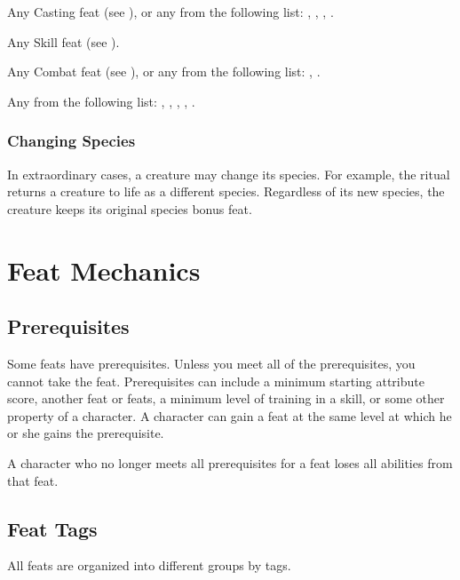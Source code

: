          Any Casting feat (see ), or any from the following list: , , , .

         Any Skill feat (see ).

         Any Combat feat (see ), or any from the following list: , .

         Any from the following list: , , , , .

        \subsubsection{Changing Species}
            In extraordinary cases, a creature may change its species.
            For example, the  ritual returns a creature to life as a different species.
            Regardless of its new species, the creature keeps its original species bonus feat.

\section{Feat Mechanics}

    \subsection{Prerequisites}
        Some feats have prerequisites.
        Unless you meet all of the prerequisites, you cannot take the feat.
        Prerequisites can include a minimum starting attribute score, another feat or feats, a minimum level of training in a skill, or some other property of a character.
        A character can gain a feat at the same level at which he or she gains the prerequisite.

        A character who no longer meets all prerequisites for a feat loses all abilities from that feat.

    \subsection{Feat Tags}
        All feats are organized into different groups by tags.

